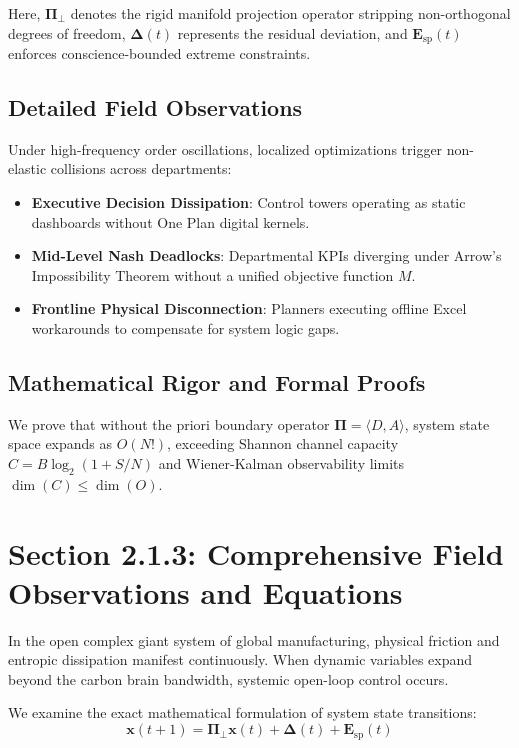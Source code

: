 \documentclass[12pt,a4paper,oneside]{book}
\begin{document}
Here, $\mathbf{\Pi}_{\bot}$ denotes the rigid manifold projection operator stripping non-orthogonal degrees of freedom, $\mathbf{\Delta}(t)$ represents the residual deviation, and $\mathbf{E}_{\mathrm{sp}}(t)$ enforces conscience-bounded extreme constraints.

\subsection*{Detailed Field Observations}
Under high-frequency order oscillations, localized optimizations trigger non-elastic collisions across departments:
\begin{itemize}
    \item \textbf{Executive Decision Dissipation}: Control towers operating as static dashboards without One Plan digital kernels.
    \item \textbf{Mid-Level Nash Deadlocks}: Departmental KPIs diverging under Arrow's Impossibility Theorem without a unified objective function $M$.
    \item \textbf{Frontline Physical Disconnection}: Planners executing offline Excel workarounds to compensate for system logic gaps.
\end{itemize}

\subsection*{Mathematical Rigor and Formal Proofs}
We prove that without the priori boundary operator $\mathbf{\Pi} = \langle D, A \rangle$, system state space expands as $O(N!)$, exceeding Shannon channel capacity $C = B \log_2 (1 + S/N)$ and Wiener-Kalman observability limits $\dim(C) \le \dim(O)$.
\clearpage
\section{Section 2.1.3: Comprehensive Field Observations and Equations}

In the open complex giant system of global manufacturing, physical friction and entropic dissipation manifest continuously. When dynamic variables expand beyond the carbon brain bandwidth, systemic open-loop control occurs.

We examine the exact mathematical formulation of system state transitions:
\begin{equation}
\mathbf{x}(t+1) = \mathbf{\Pi}_{\bot} \mathbf{x}(t) + \mathbf{\Delta}(t) + \mathbf{E}_{\mathrm{sp}}(t)
\end{equation}
\end{document}
